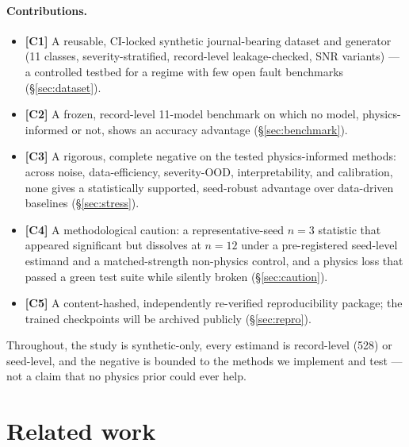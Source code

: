 \documentclass{article}
\begin{document}
\paragraph{Contributions.}
\begin{itemize}\setlength{\itemsep}{1pt}
  \item \textbf{[C1]} A reusable, CI-locked synthetic journal-bearing dataset and
    generator (11 classes, severity-stratified, record-level leakage-checked, SNR
    variants) --- a controlled testbed for a regime with few open fault
    benchmarks (\S\ref{sec:dataset}).
  \item \textbf{[C2]} A frozen, record-level 11-model benchmark on which no model,
    physics-informed or not, shows an accuracy advantage (\S\ref{sec:benchmark}).
  \item \textbf{[C3]} A rigorous, complete negative on the tested
    physics-informed methods: across noise, data-efficiency, severity-OOD,
    interpretability, and calibration, none gives a statistically supported,
    seed-robust advantage over data-driven baselines (\S\ref{sec:stress}).
  \item \textbf{[C4]} A methodological caution: a representative-seed $n{=}3$
    statistic that appeared significant but dissolves at $n{=}12$ under a
    pre-registered seed-level estimand and a matched-strength non-physics
    control, and a physics loss that passed a green test suite while silently
    broken (\S\ref{sec:caution}).
  \item \textbf{[C5]} A content-hashed, independently re-verified reproducibility
    package; the trained checkpoints will be archived publicly
    (\S\ref{sec:repro}).
\end{itemize}
Throughout, the study is synthetic-only, every estimand is record-level (528) or
seed-level, and the negative is bounded to the methods we implement and test ---
not a claim that no physics prior could ever help.

\section{Related work}
\label{sec:related}
\end{document}
